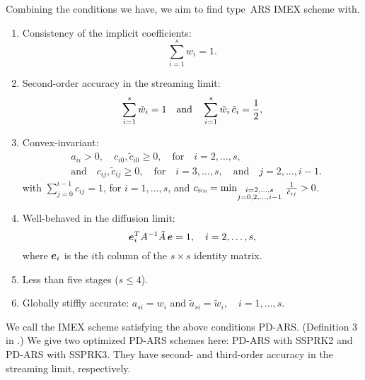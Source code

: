 Combining the conditions we have, we aim to find type~ARS IMEX scheme with.
\begin{enumerate}
    \item Consistency of the implicit coefficients:
    \begin{equation}
      \sum_{i=1}^{s}w_{i}=1.
    \end{equation}
    \item Second-order accuracy in the streaming limit:
    \begin{equation}
      \sum_{i=1}^{s}\tilde{w}_{i}=1
      \quad\text{and}\quad
      \sum_{i=1}^{s}\tilde{w}_{i}\,\tilde{c}_{i}=\frac{1}{2},
      \label{eq:orderConditionsEx}
    \end{equation}
    \item Convex-invariant:
    \begin{align}
      &a_{ii}>0, \quad c_{i0},\tilde{c}_{i0}\ge0, \quad \text{for} \quad i=2,\ldots,s, \nonumber \\
      &\text{and} \quad c_{ij},\tilde{c}_{ij}\ge0, \quad \text{for} \quad i=3,\ldots,s, \quad\text{and}\quad j=2,\ldots,i-1.  
    \end{align}
    with $\sum_{j=0}^{i-1}c_{ij}=1$, for $i=1,\ldots,s$, and $c_{\textnormal{\tiny\textsc{Sch}}}=\min_{\substack{i = 2,\ldots,s \\ 
                  j = 0,2,\ldots,i-1}}\,\frac{1}{\hat{c}_{ij}}>0$.
    \item Well-behaved in the diffusion limit:
    \begin{equation}
      \boldsymbol{e}_{i}^{T}A^{-1}\tilde{A}\,\boldsymbol{e} = 1, \quad i=2,\ldots,s,
      \label{eq:diffusionCondition}
    \end{equation}
    where $\boldsymbol{e}_{i}$ is the $i$th column of the $s\times s$ identity matrix.
    \item Less than five stages ($s\le4$).
    \item Globally stiffly accurate: $a_{si}=w_{i}$ and $\tilde{a}_{si}=\tilde{w}_{i},\quad i=1,\ldots,s$. 
\end{enumerate}  
We call the IMEX scheme satisfying the above conditions {PD-ARS}. (Definition 3 in \cite{chu_etal_2018}.)
We give two optimized PD-ARS schemes here: PD-ARS with SSPRK2 and  PD-ARS with SSPRK3. 
They have second- and third-order accuracy in the streaming limit, respectively.
